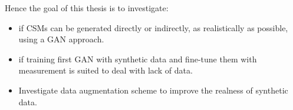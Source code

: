 \documentclass[12pt,pdftex,16x10]{elpres} %
\begin{document}
\begin{psli}
  Hence the goal of this thesis is to investigate:
  \begin{itemize}
    \item  if CSMs can be generated directly or indirectly, as realistically as possible, using a GAN approach.
    \item if training first GAN with synthetic data and fine-tune them with measurement is suited to deal with lack of data.
    \item Investigate data augmentation scheme to improve the realness of synthetic data.
  \end{itemize}
\end{psli}
\end{document}
